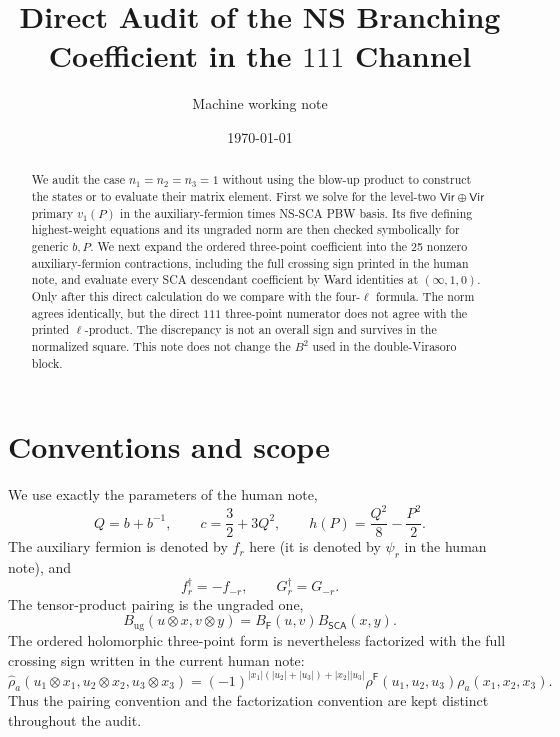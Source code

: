 \documentclass[11pt]{article}
\title{Direct Audit of the NS Branching Coefficient in the \(111\) Channel}
\author{Machine working note}
\date{\today}
\newcommand{\SCA}{\mathsf{SCA}}
\newcommand{\Vir}{\mathsf{Vir}}
\newcommand{\Ff}{\mathsf F}
\newcommand{\hatrho}{\widehat\rho}
\newcommand{\rhof}{\rho^{\Ff}}
\begin{document}
\maketitle

\begin{abstract}
We audit the case \(n_1=n_2=n_3=1\) without using the blow-up product to
construct the states or to evaluate their matrix element.  First we solve for
the level-two \(\Vir\oplus\Vir\) primary \(v_1(P)\) in the auxiliary-fermion
times NS-SCA PBW basis.  Its five defining highest-weight equations and its
ungraded norm are then checked symbolically for generic \(b,P\).  We next
expand the ordered three-point coefficient into the 25 nonzero
auxiliary-fermion contractions, including the full crossing sign printed in
the human note, and evaluate every SCA descendant coefficient by Ward
identities at \((\infty,1,0)\).  Only after this direct calculation do we
compare with the four-\(\ell\) formula.  The norm agrees identically, but the
direct \(111\) three-point numerator does not agree with the printed
\(\ell\)-product.  The discrepancy is not an overall sign and survives in the
normalized square.  This note does not change the \(B^2\) used in the
double-Virasoro block.
\end{abstract}

\tableofcontents

\section{Conventions and scope}

We use exactly the parameters of the human note,
\begin{equation}
 Q=b+b^{-1},\qquad
 c=\frac32+3Q^2,\qquad
 h(P)=\frac{Q^2}{8}-\frac{P^2}{2}.
 \label{eq:parameters}
\end{equation}
The auxiliary fermion is denoted by \(f_r\) here (it is denoted by
\(\psi_r\) in the human note), and
\begin{equation}
 f_r^\dagger=-f_{-r},\qquad G_r^\dagger=G_{-r}.
 \label{eq:dagger}
\end{equation}
The tensor-product pairing is the ungraded one,
\begin{equation}
 B_{\mathrm{ug}}(u\otimes x,v\otimes y)
 =B_{\Ff}(u,v)B_{\SCA}(x,y).
 \label{eq:ungraded-pairing}
\end{equation}
The ordered holomorphic three-point form is nevertheless factorized with the
full crossing sign written in the current human note:
\begin{equation}
 \hatrho_a(u_1\otimes x_1,u_2\otimes x_2,u_3\otimes x_3)
 =(-1)^{|x_1|(|u_2|+|u_3|)+|x_2||u_3|}
 \rhof(u_1,u_2,u_3)\rho_a(x_1,x_2,x_3).
 \label{eq:full-crossing}
\end{equation}
Thus the pairing convention and the factorization convention are kept
distinct throughout the audit.
\end{document}
